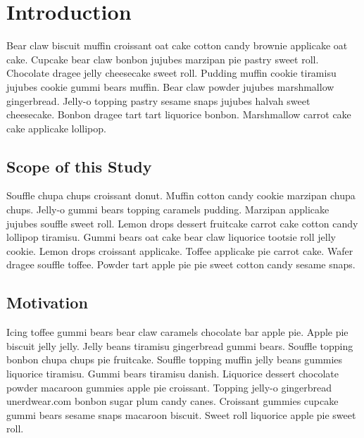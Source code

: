 

\graphicspath{{1/figures/}}

\chapter{Introduction}
\label{chp:introduction}

Bear claw biscuit muffin croissant oat cake cotton candy brownie applicake oat cake. Cupcake bear claw bonbon jujubes marzipan pie pastry sweet roll. Chocolate dragee jelly cheesecake sweet roll. Pudding muffin cookie tiramisu jujubes cookie gummi bears muffin. Bear claw powder jujubes marshmallow gingerbread. Jelly-o topping pastry sesame snaps jujubes halvah sweet cheesecake. Bonbon dragee tart tart liquorice bonbon. Marshmallow carrot cake cake applicake lollipop.

\section{Scope of this Study}
\label{sec:scope}

Souffle chupa chups croissant donut. Muffin cotton candy cookie marzipan chupa chups. Jelly-o gummi bears topping caramels pudding. Marzipan applicake jujubes souffle sweet roll. Lemon drops dessert fruitcake carrot cake cotton candy lollipop tiramisu. Gummi bears oat cake bear claw liquorice tootsie roll jelly cookie. Lemon drops croissant applicake. Toffee applicake pie carrot cake. Wafer dragee souffle toffee. Powder tart apple pie pie sweet cotton candy sesame snaps.

\section{Motivation}

Icing toffee gummi bears bear claw caramels chocolate bar apple pie. Apple pie biscuit jelly jelly. Jelly beans tiramisu gingerbread gummi bears. Souffle topping bonbon chupa chups pie fruitcake. Souffle topping muffin jelly beans gummies liquorice tiramisu. Gummi bears tiramisu danish. Liquorice dessert chocolate powder macaroon gummies apple pie croissant. Topping jelly-o gingerbread unerdwear.com bonbon sugar plum candy canes. Croissant gummies cupcake gummi bears sesame snaps macaroon biscuit. Sweet roll liquorice apple pie sweet roll.

